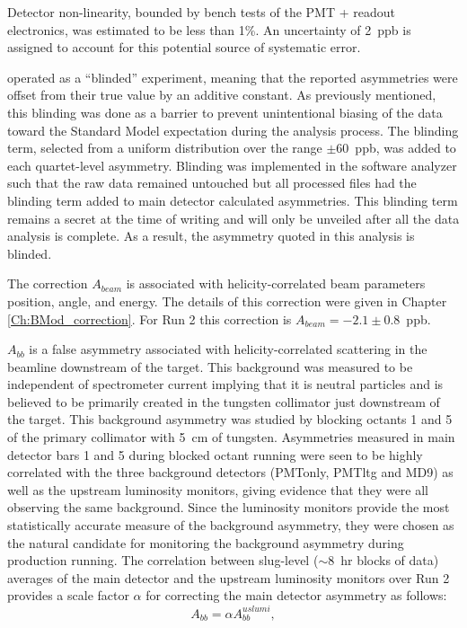 Detector non-linearity, bounded by bench tests of the PMT + readout electronics, was estimated to be less than 1\%. An uncertainty of 2~ppb is assigned to account for this potential source of systematic error.   

\Qs operated as a ``blinded'' experiment, meaning that the reported asymmetries were offset from their true value by an additive constant. As previously mentioned, this blinding was done as a barrier to prevent unintentional biasing of the data toward the Standard Model expectation during the analysis process. The blinding term, selected from a uniform distribution over the range $\pm 60$~ppb, was added to each quartet-level asymmetry. Blinding was implemented in the software analyzer such that the raw data remained untouched but all processed files had the blinding term added to main detector calculated asymmetries. This blinding term remains a secret at the time of writing and will only be unveiled after all the data analysis is complete. As a result, the asymmetry quoted in this analysis is blinded.

The correction $A_{beam}$ is associated with helicity-correlated beam parameters position, angle, and energy. The details of this correction were given in Chapter \ref{Ch:BMod_correction}. For Run 2 this correction is $A_{beam}=-2.1\pm 0.8$~ppb.

$A_{bb}$ is a false asymmetry associated with helicity-correlated scattering in the beamline downstream of the target. This background was measured to be independent of spectrometer current implying that it is neutral particles and is believed to be primarily created in the tungsten collimator just downstream of the target. This background asymmetry was studied by blocking octants 1 and 5 of the primary collimator with 5~cm of tungsten. Asymmetries measured in main detector bars 1 and 5 during blocked octant running were seen to be highly correlated with the three background detectors (PMTonly, PMTltg and MD9) as well as the upstream luminosity monitors, giving evidence that they were all observing the same background. Since the luminosity monitors provide the most statistically accurate measure of the background asymmetry, they were chosen as the natural candidate for monitoring the background asymmetry during production running. The correlation between slug-level ($\sim$8~hr blocks of data) averages of the main detector and the upstream luminosity monitors over Run 2 provides a scale factor $\alpha$ for correcting the main detector asymmetry as follows:
\[
A_{bb}=\alpha A_{bb}^{uslumi},
\]
  
